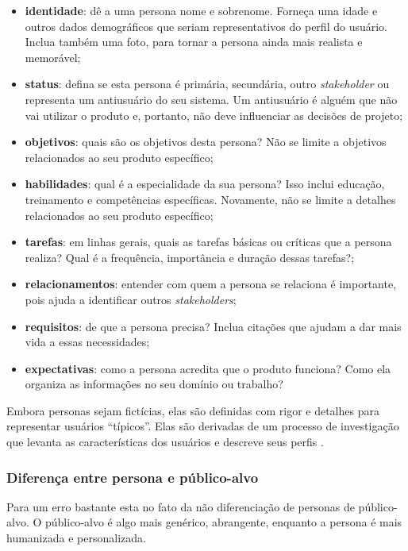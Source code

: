 \begin{itemize}
	\item \textbf{identidade}: dê a uma persona nome e sobrenome. Forneça uma idade e outros dados demográficos que seriam representativos do perfil do usuário. Inclua também uma foto, para tornar a persona ainda mais realista e memorável;
	\item \textbf{status}: defina se esta persona é primária, secundária, outro \textit{stakeholder} ou representa um antiusuário do seu sistema. Um antiusuário é alguém que não vai utilizar o produto e, portanto, não deve influenciar as decisões de projeto;
	\item \textbf{objetivos}: quais são os objetivos desta persona? Não se limite a objetivos relacionados ao seu produto específico;
	\item \textbf{habilidades}: qual é a especialidade da sua persona? Isso inclui educação, treinamento e competências específicas. Novamente, não se limite a detalhes relacionados ao seu produto específico;
	\item \textbf{tarefas}: em linhas gerais, quais as tarefas básicas ou críticas que a persona realiza? Qual é a frequência, importância e duração dessas tarefas?;
	\item \textbf{relacionamentos}: entender com quem a persona se relaciona é importante, pois ajuda a identificar outros \textit{stakeholders};
	\item \textbf{requisitos}: de que a persona precisa? Inclua citações que ajudam a dar mais vida a essas necessidades;
	\item \textbf{expectativas}: como a persona acredita que o produto funciona? Como ela organiza as informações no seu domínio ou trabalho?
\end{itemize}

Embora personas sejam fictícias, elas são definidas com rigor e detalhes para representar usuários ``típicos''. Elas são derivadas de um processo de investigação que levanta as características dos usuários e descreve seus perfis \cite{barbosa2010IHC}.

\subsubsection{Diferença entre persona e público-alvo}

Para  um erro bastante esta no fato da não diferenciação de personas de público-alvo. O público-alvo é algo mais genérico, abrangente, enquanto a persona é mais humanizada e personalizada.

